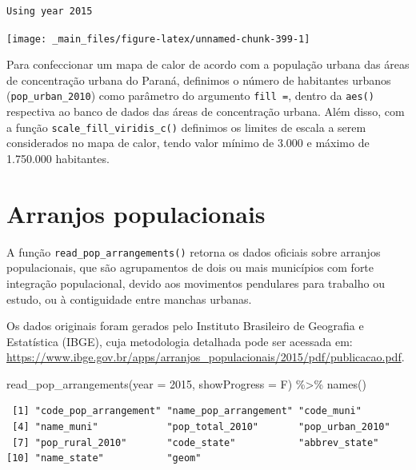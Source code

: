 \documentclass[
  brazilian,
]{book}
\newenvironment{Shaded}{\begin{snugshade}}{\end{snugshade}}
\newcommand{\AttributeTok}[1]{\textcolor[rgb]{0.77,0.63,0.00}{#1}}
\newcommand{\DecValTok}[1]{\textcolor[rgb]{0.00,0.00,0.81}{#1}}
\newcommand{\FunctionTok}[1]{\textcolor[rgb]{0.00,0.00,0.00}{#1}}
\newcommand{\NormalTok}[1]{#1}
\newcommand{\SpecialCharTok}[1]{\textcolor[rgb]{0.00,0.00,0.00}{#1}}
\begin{document}
\begin{verbatim}
Using year 2015
\end{verbatim}

\begin{center}\texttt{[image: \_main\_files/figure-latex/unnamed-chunk-399-1]} \end{center}

Para confeccionar um mapa de calor de acordo com a população urbana das áreas de concentração urbana do Paraná, definimos o número de habitantes urbanos (\texttt{pop\_urban\_2010}) como parâmetro do argumento \texttt{fill\ =}, dentro da \texttt{aes()} respectiva ao banco de dados das áreas de concentração urbana. Além disso, com a função \texttt{scale\_fill\_viridis\_c()} definimos os limites de escala a serem considerados no mapa de calor, tendo valor mínimo de 3.000 e máximo de 1.750.000 habitantes.

\hypertarget{arranjos-populacionais}{%
\section{Arranjos populacionais}\label{arranjos-populacionais}}

A função \texttt{read\_pop\_arrangements()} retorna os dados oficiais sobre arranjos populacionais, que são agrupamentos de dois ou mais municípios com forte integração populacional, devido aos movimentos pendulares para trabalho ou estudo, ou à contiguidade entre manchas urbanas.

Os dados originais foram gerados pelo Instituto Brasileiro de Geografia e Estatística (IBGE), cuja metodologia detalhada pode ser acessada em: \url{https://www.ibge.gov.br/apps/arranjos_populacionais/2015/pdf/publicacao.pdf}.

\begin{Shaded}
\begin{Highlighting}[]
\FunctionTok{read\_pop\_arrangements}\NormalTok{(}\AttributeTok{year =} \DecValTok{2015}\NormalTok{, }\AttributeTok{showProgress =}\NormalTok{ F) }\SpecialCharTok{\%\textgreater{}\%} \FunctionTok{names}\NormalTok{()}
\end{Highlighting}
\end{Shaded}

\begin{verbatim}
 [1] "code_pop_arrangement" "name_pop_arrangement" "code_muni"           
 [4] "name_muni"            "pop_total_2010"       "pop_urban_2010"      
 [7] "pop_rural_2010"       "code_state"           "abbrev_state"        
[10] "name_state"           "geom"                
\end{verbatim}
\end{document}
